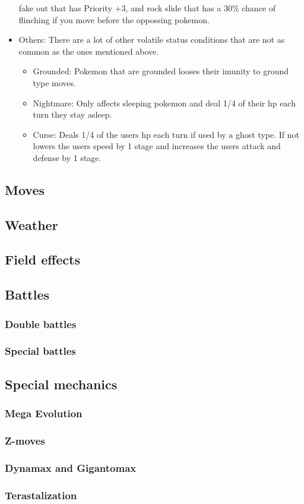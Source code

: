 \begin{itemize}
    fake out that has Priority +3, and rock slide that has a 30\% chance of flinching if you move before the oppossing pokemon.
  \item Others: There are a lot of other volatile status conditions that are not as common as the ones mentioned above.
  \begin{itemize}
    \item Grounded: Pokemon that are grounded looses their imunity to ground type moves.
    \item Nightmare: Only affects sleeping pokemon and deal 1/4 of their hp each turn they stay asleep.
    \item Curse: Deals 1/4 of the users hp each turn if used by a ghost type. If not lowers the users speed by 1 stage and increases 
      the users attack and defense by 1 stage.
  \end{itemize}
\end{itemize}
\subsection{Moves}
\subsection{Weather}
\subsection{Field effects}
\subsection{Battles}
\subsubsection{Double battles}
\subsubsection{Special battles}
\subsection{Special mechanics}
\subsubsection{Mega Evolution}
\subsubsection{Z-moves}
\subsubsection{Dynamax and Gigantomax}
\subsubsection{Terastalization}
